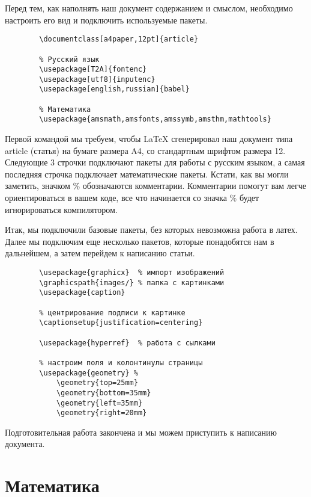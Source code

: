     Перед тем, как наполнять наш документ содержанием и смыслом, необходимо настроить его вид и подключить используемые пакеты.

    \begin{verbatim}
        \documentclass[a4paper,12pt]{article}

        % Русский язык
        \usepackage[T2A]{fontenc}
        \usepackage[utf8]{inputenc}	
        \usepackage[english,russian]{babel}

        % Математика
        \usepackage{amsmath,amsfonts,amssymb,amsthm,mathtools} 
    \end{verbatim}

    Первой командой мы требуем, чтобы \LaTeX{} сгенерировал наш документ типа article (статья) на бумаге размера A4, со стандартным шрифтом размера 12.
    Следующие 3 строчки подключают пакеты для работы с русским языком, а самая последняя строчка подключает математические пакеты.
    Кстати, как вы могли заметить, значком \% обозначаются комментарии. Комментарии помогут вам легче ориентироваться в вашем коде,
    все что начинается со значка \% будет игнорироваться компилятором.
    
    Итак, мы подключили базовые пакеты, без которых невозможна работа в латех. Далее мы подключим еще
    несколько пакетов, которые понадобятся нам в дальнейшем, а затем перейдем к написанию статьи.

    \begin{verbatim}
        \usepackage{graphicx}  % импорт изображений
        \graphicspath{images/} % папка с картинками
        \usepackage{caption}

        % центрирование подписи к картинке
        \captionsetup{justification=centering}

        \usepackage{hyperref}  % работа с сылками

        % настроим поля и колонтинулы страницы
        \usepackage{geometry} %
            \geometry{top=25mm}
            \geometry{bottom=35mm}
            \geometry{left=35mm}
            \geometry{right=20mm}
    \end{verbatim}

    Подготовительная работа закончена и мы можем приступить к написанию документа.


    \section{Математика}

